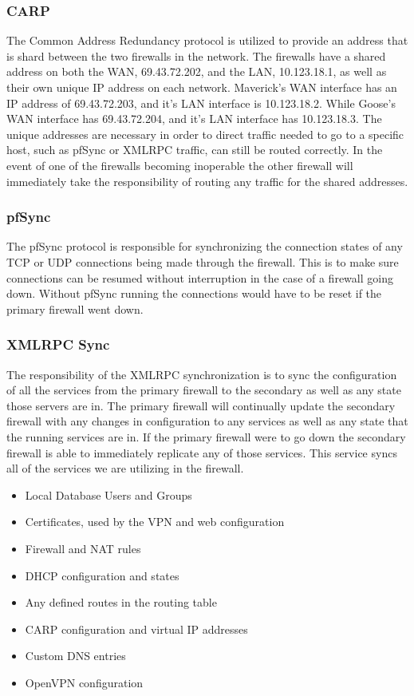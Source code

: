 \documentclass[12pt]{IEEEtran}
\begin{document}
\subsubsection{CARP}
The Common Address Redundancy protocol is utilized to provide an address that is shard between the two firewalls in the network.
The firewalls have a shared address on both the WAN, 69.43.72.202, and the LAN, 10.123.18.1, as well as their own unique IP address on each network.
Maverick's WAN interface has an IP address of 69.43.72.203, and it's LAN interface is 10.123.18.2.
While Goose's WAN interface has 69.43.72.204, and it's LAN interface has 10.123.18.3. 
The unique addresses are necessary in order to direct traffic needed to go to a specific host, such as pfSync or XMLRPC traffic, can still be routed correctly. 
In the event of one of the firewalls becoming inoperable the other firewall will immediately take the responsibility of routing any traffic for the shared addresses.
\subsubsection{pfSync}
The pfSync protocol is responsible for synchronizing the connection states of any TCP or UDP connections being made through the firewall.
This is to make sure connections can be resumed without interruption in the case of a firewall going down. 
Without pfSync running the connections would have to be reset if the primary firewall went down. 
\subsubsection{XMLRPC Sync}
The responsibility of the XMLRPC synchronization is to sync the configuration of all the services from the primary firewall to the secondary as well as any state those servers are in.
The primary firewall will continually update the secondary firewall with any changes in configuration to any services as well as any state that the running services are in.
If the primary firewall were to go down the secondary firewall is able to immediately replicate any of those services. 
This service syncs all of the services we are utilizing in the firewall. 
\begin{itemize}
\item Local Database Users and Groups
\item Certificates, used by the VPN and web configuration
\item Firewall and NAT rules
\item DHCP configuration and states
\item Any defined routes in the routing table
\item CARP configuration and virtual IP addresses
\item Custom DNS entries
\item OpenVPN configuration
\end{itemize}
\end{document}
